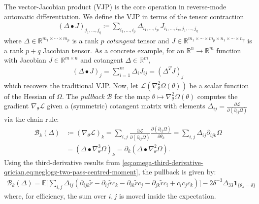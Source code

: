 \documentclass{article}
\begin{document}
The vector-Jacobian product (VJP) is the core operation in reverse-mode automatic differentiation.
We define the VJP in terms of the tensor contraction
%
\begin{align}\label{eq:general-bullet-contraction}
  (\Delta \bullet J)_{j_1, \ldots, j_q} \coloneqq \sum_{i_1, \ldots, i_p} \Delta_{i_1, \ldots, i_p} \, J_{i_1, \ldots, i_p, j_1, \ldots, j_q}
\end{align}
%
where $\Delta \in \mathbb{R}^{m_1 \times \cdots \times m_p}$ is a rank $p$ \textit{cotangent} tensor and $J \in \mathbb{R}^{m_1 \times \cdots \times m_p \times n_1 \times \cdots \times n_q}$ is a rank $p+q$ Jacobian tensor.
As a concrete example, for an $\mathbb{R}^n \to \mathbb{R}^m$ function with Jacobian $J \in \mathbb{R}^{m \times n}$ and cotangent $\Delta \in \mathbb{R}^m$,
%
\begin{align}
  (\Delta \bullet J)_j = \sum_{i=1}^m \Delta_i J_{i j} = (\Delta^{T} J)_j
\end{align}
%
which recovers the traditional VJP.
Now, let $\mathcal{L}(\nabla_\theta^2 \Omega(\theta))$ be a scalar function of the Hessian of $\Omega$.
The \textit{pullback} $\mathcal{B}$ for the map $\theta \mapsto \nabla_\theta^2 \Omega(\theta)$ computes the gradient $\nabla_\theta \mathcal{L}$ given a (symmetric) cotangent matrix with elements $\Delta_{ij} = \frac{\partial \mathcal{L}}{\partial (\partial_{ij} \Omega)}$ via the chain rule:
%
\begin{align}
  \mathcal{B}_k(\Delta) & \coloneqq (\nabla_\theta \mathcal{L})_k = \sum_{i,j} \frac{\partial \mathcal{L}}{\partial (\partial_{ij} \Omega)} \frac{\partial (\partial_{ij} \Omega)}{\partial \theta_k} = \sum_{i,j} \Delta_{ij} \partial_{ijk} \Omega \label{eq:vjp-omega-hessian-explicit} \\
                        & = (\Delta \bullet \nabla_\theta^3 \Omega)_k = \partial_k (\Delta \bullet \nabla_\theta^2 \Omega). \label{eq:vjp-omega-hessian}
\end{align}
%
Using the third-derivative results from \cref{eq:omega-third-derivative-qrician,eq:neglogz-two-pass-centred-moment}, the pullback is given by:
%
\begin{align}
  \mathcal{B}_k(\Delta) = \mathbb{E} \bigg[ \sum_{i,j} \Delta_{ij} (\partial_{ijk} \tilde{r} - \partial_{ij} \tilde{r} c_k - \partial_{ik} \tilde{r} c_j - \partial_{jk} \tilde{r} c_i + c_i c_j c_k) \bigg] - 2 \delta^{-3} \Delta_{33} \mathbf{1}_{\{\theta_k=\delta\}}
\end{align}
%
where, for efficiency, the sum over $i,j$ is moved inside the expectation.
\end{document}
